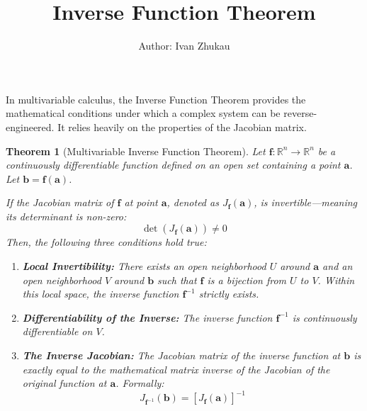 \documentclass{article}
\title{Inverse Function Theorem}
\author{Author: Ivan Zhukau}
\newtheorem{theorem}{Theorem}
\begin{document}
\maketitle

In multivariable calculus, the Inverse Function Theorem provides the mathematical conditions under which a complex system can be reverse-engineered. It relies heavily on the properties of the Jacobian matrix.

\begin{theorem}[Multivariable Inverse Function Theorem]
Let $\mathbf{f} : \mathbb{R}^n \to \mathbb{R}^n$ be a continuously differentiable function defined on an open set containing a point $\mathbf{a}$. Let $\mathbf{b} = \mathbf{f}(\mathbf{a})$.

If the Jacobian matrix of $\mathbf{f}$ at point $\mathbf{a}$, denoted as $J_{\mathbf{f}}(\mathbf{a})$, is invertible---meaning its determinant is non-zero:
\[
    \det(J_{\mathbf{f}}(\mathbf{a})) \neq 0
\]
Then, the following three conditions hold true:
\begin{enumerate}
    \item \textbf{Local Invertibility:} There exists an open neighborhood $U$ around $\mathbf{a}$ and an open neighborhood $V$ around $\mathbf{b}$ such that $\mathbf{f}$ is a bijection from $U$ to $V$. Within this local space, the inverse function $\mathbf{f}^{-1}$ strictly exists.

    \item \textbf{Differentiability of the Inverse:} The inverse function $\mathbf{f}^{-1}$ is continuously differentiable on $V$.

    \item \textbf{The Inverse Jacobian:} The Jacobian matrix of the inverse function at $\mathbf{b}$ is exactly equal to the mathematical matrix inverse of the Jacobian of the original function at $\mathbf{a}$. Formally:
    \[
        J_{\mathbf{f}^{-1}}(\mathbf{b}) = [J_{\mathbf{f}}(\mathbf{a})]^{-1}
    \]
\end{enumerate}
\end{theorem}
\end{document}
